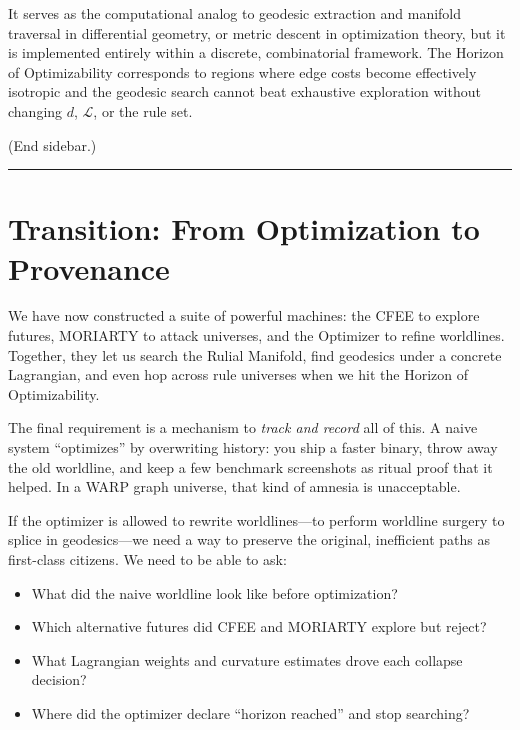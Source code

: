 It serves as the computational analog to geodesic extraction and manifold traversal in differential geometry, or metric descent in optimization theory, but it is implemented entirely within a discrete, combinatorial framework. The Horizon of Optimizability corresponds to regions where edge costs become effectively isotropic and the geodesic search cannot beat exhaustive exploration without changing $d$, $\mathcal{L}$, or the rule set.

(End sidebar.)

\begin{center}\rule{0.5\linewidth}{0.5pt}\end{center}

\section{Transition: From Optimization to Provenance}
\label{transition-from-optimization-to-provenance}

We have now constructed a suite of powerful machines: the CFEE to explore futures, MORIARTY to attack universes, and the Optimizer to refine worldlines. Together, they let us search the Rulial Manifold, find geodesics under a concrete Lagrangian, and even hop across rule universes when we hit the Horizon of Optimizability.

The final requirement is a mechanism to \emph{track and record} all of this. A naive system ``optimizes'' by overwriting history: you ship a faster binary, throw away the old worldline, and keep a few benchmark screenshots as ritual proof that it helped. In a WARP graph universe, that kind of amnesia is unacceptable.

If the optimizer is allowed to rewrite worldlines—to perform worldline surgery to splice in geodesics—we need a way to preserve the original, inefficient paths as first-class citizens. We need to be able to ask:

\begin{itemize}
  \item What did the naive worldline look like before optimization?
  \item Which alternative futures did CFEE and MORIARTY explore but reject?
  \item What Lagrangian weights and curvature estimates drove each collapse decision?
  \item Where did the optimizer declare ``horizon reached'' and stop searching?
\end{itemize}

